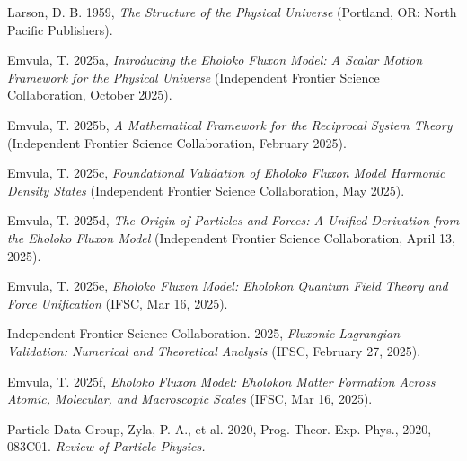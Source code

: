 \documentclass[11pt]{article}
\begin{document}

\begin{thebibliography}{99}
\raggedright

Larson, D. B. 1959, \textit{The Structure of the Physical Universe} (Portland, OR: North Pacific Publishers).

Emvula, T. 2025a, \textit{Introducing the Eholoko Fluxon Model: A Scalar Motion Framework for the Physical Universe} (Independent Frontier Science Collaboration, October 2025). 

Emvula, T. 2025b, \textit{A Mathematical Framework for the Reciprocal System Theory} (Independent Frontier Science Collaboration, February 2025).

Emvula, T. 2025c, \textit{Foundational Validation of Eholoko Fluxon Model Harmonic Density States} (Independent Frontier Science Collaboration, May 2025).

Emvula, T. 2025d, \textit{The Origin of Particles and Forces: A Unified Derivation from the Eholoko Fluxon Model} (Independent Frontier Science Collaboration, April 13, 2025).

Emvula, T. 2025e, \textit{Eholoko Fluxon Model: Eholokon Quantum Field Theory and Force Unification} (IFSC, Mar 16, 2025).

Independent Frontier Science Collaboration. 2025, \textit{Fluxonic Lagrangian Validation: Numerical and Theoretical Analysis} (IFSC, February 27, 2025).

Emvula, T. 2025f, \textit{Eholoko Fluxon Model: Eholokon Matter Formation Across Atomic, Molecular, and Macroscopic Scales} (IFSC, Mar 16, 2025). 

Particle Data Group, Zyla, P. A., et al. 2020, Prog. Theor. Exp. Phys., 2020, 083C01. 
\textit{Review of Particle Physics.}

\end{thebibliography}
\end{document}
